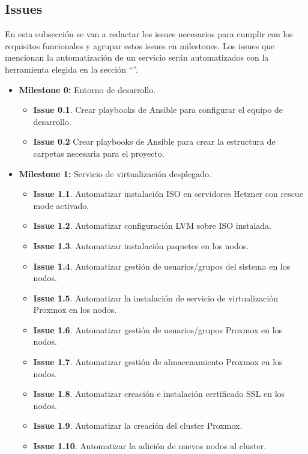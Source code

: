 \subsection{Issues}
\label{issues}
\begin{text}
	En esta subsección se van a redactar los issues necesarios para cumplir con los requisitos funcionales y agrupar estos issues en milestones. Los issues que mencionan la automatización de un servicio serán automatizados con la herramienta elegida en la sección ``''.
	
	\begin{itemize}
		\item \textbf{Milestone 0:} Entorno de desarrollo. 
		\begin{itemize}
			\item \textbf{Issue 0.1}. Crear playbooks de Ansible para configurar el equipo de desarrollo.
			\item \textbf{Issue 0.2} Crear playbooks de Ansible para crear la estructura de carpetas necesaria para el proyecto.
		\end{itemize}
		\item \textbf{Milestone 1:} Servicio de virtualización desplegado. 
		\begin{itemize}
			\item \textbf{Issue 1.1}. Automatizar instalación ISO en servidores Hetzner con rescue mode activado.
			\item \textbf{Issue 1.2}. Automatizar configuración LVM sobre ISO instalada.
			\item \textbf{Issue 1.3}. Automatizar instalación paquetes en los nodos.
			\item \textbf{Issue 1.4}. Automatizar gestión de usuarios/grupos del sistema en los nodos.
			\item \textbf{Issue 1.5}. Automatizar la instalación de servicio de virtualización Proxmox en los nodos.
			\item \textbf{Issue 1.6}. Automatizar gestión de usuarios/grupos Proxmox en los nodos.
			\item \textbf{Issue 1.7}. Automatizar gestión de almacenamiento Proxmox en los nodos.
			\item \textbf{Issue 1.8}. Automatizar creación e instalación certificado SSL en los nodos.
			\item \textbf{Issue 1.9}. Automatizar la creación del cluster Proxmox.
			\item \textbf{Issue 1.10}. Automatizar la adición de nuevos nodos al cluster.

\end{itemize}
\end{itemize}
\end{text}
